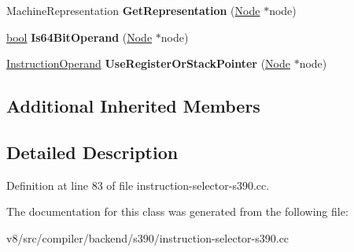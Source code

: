 \begin{DoxyCompactItemize}
\item 
\mbox{\label{classv8_1_1internal_1_1compiler_1_1S390OperandGenerator_ac50cd4e0133d3cc15d9efa59ac321abc}} 
Machine\+Representation {\bfseries Get\+Representation} (\mbox{\hyperlink{classv8_1_1internal_1_1compiler_1_1Node}{Node}} $\ast$node)
\item 
\mbox{\label{classv8_1_1internal_1_1compiler_1_1S390OperandGenerator_a5c33aa9ec4904881b053410cbfe436a8}} 
\mbox{\hyperlink{classbool}{bool}} {\bfseries Is64\+Bit\+Operand} (\mbox{\hyperlink{classv8_1_1internal_1_1compiler_1_1Node}{Node}} $\ast$node)
\item 
\mbox{\label{classv8_1_1internal_1_1compiler_1_1S390OperandGenerator_a99d5c4373946b831df6acbe1e676a17e}} 
\mbox{\hyperlink{classv8_1_1internal_1_1compiler_1_1InstructionOperand}{Instruction\+Operand}} {\bfseries Use\+Register\+Or\+Stack\+Pointer} (\mbox{\hyperlink{classv8_1_1internal_1_1compiler_1_1Node}{Node}} $\ast$node)
\end{DoxyCompactItemize}
\subsection*{Additional Inherited Members}


\subsection{Detailed Description}


Definition at line 83 of file instruction-\/selector-\/s390.\+cc.



The documentation for this class was generated from the following file\+:\begin{DoxyCompactItemize}
\item 
v8/src/compiler/backend/s390/instruction-\/selector-\/s390.\+cc\end{DoxyCompactItemize}
